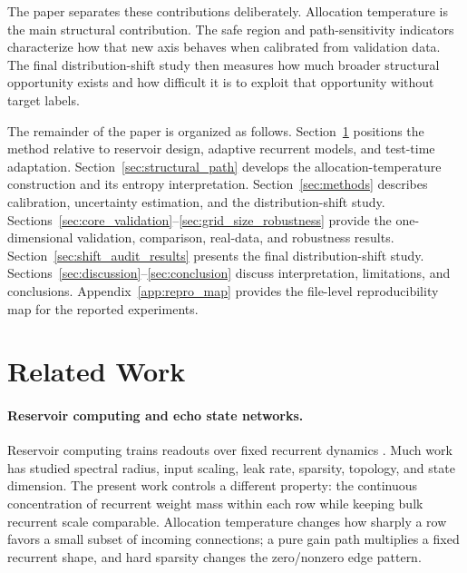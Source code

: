 \documentclass[11pt,a4paper]{article}
\begin{document}
The paper separates these contributions deliberately. Allocation temperature is the main structural contribution. The safe region and path-sensitivity indicators characterize how that new axis behaves when calibrated from validation data. The final distribution-shift study then measures how much broader structural opportunity exists and how difficult it is to exploit that opportunity without target labels.

The remainder of the paper is organized as follows. Section~\ref{sec:related_work} positions the method relative to reservoir design, adaptive recurrent models, and test-time adaptation. Section~\ref{sec:structural_path} develops the allocation-temperature construction and its entropy interpretation. Section~\ref{sec:methods} describes calibration, uncertainty estimation, and the distribution-shift study. Sections~\ref{sec:core_validation}--\ref{sec:grid_size_robustness} provide the one-dimensional validation, comparison, real-data, and robustness results. Section~\ref{sec:shift_audit_results} presents the final distribution-shift study. Sections~\ref{sec:discussion}--\ref{sec:conclusion} discuss interpretation, limitations, and conclusions. Appendix~\ref{app:repro_map} provides the file-level reproducibility map for the reported experiments.

\section{Related Work}
\label{sec:related_work}

\paragraph{Reservoir computing and echo state networks.}
Reservoir computing trains readouts over fixed recurrent dynamics \citep{jaeger2001echo,maass2002real,lukosevicius2009reservoir}. Much work has studied spectral radius, input scaling, leak rate, sparsity, topology, and state dimension. The present work controls a different property: the continuous concentration of recurrent weight mass within each row while keeping bulk recurrent scale comparable. Allocation temperature changes how sharply a row favors a small subset of incoming connections; a pure gain path multiplies a fixed recurrent shape, and hard sparsity changes the zero/nonzero edge pattern.
\end{document}
